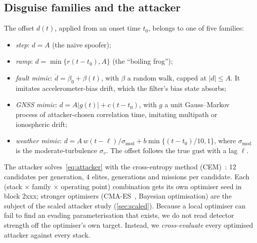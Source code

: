 \documentclass[letterpaper,twocolumn,10pt]{article}
\theoremstyle{remark}
\begin{document}
\subsection{Disguise families and the attacker}
The offset $d(t)$, applied from an onset time $t_0$, belongs to one of five
families:
\begin{itemize}
\item \emph{step}: $d=A$ (the naive spoofer);
\item \emph{ramp}: $d=\min\{r(t-t_0),A\}$ (the ``boiling frog'');
\item \emph{fault mimic}: $\ddot d=\beta_0+\beta(t)$, with $\beta$ a random walk,
  capped at $|d|\le A$. It imitates accelerometer-bias drift, which the filter's
  bias state absorbs;
\item \emph{GNSS mimic}: $d=A|g(t)|+c(t-t_0)$, with $g$ a unit Gauss--Markov
  process of attacker-chosen correlation time, imitating multipath or
  ionospheric drift;
\item \emph{weather mimic}: $d=A\,w(t-\ell)/\sigma_{\mathrm{mod}}+b\min\{(t-t_0)/10,1\}$,
  where $\sigma_{\mathrm{mod}}$ is the moderate-turbulence $\sigma_v$. The offset
  follows the true gust with a lag $\ell$.
\end{itemize}
The attacker solves~\eqref{eq:attacker} with the cross-entropy method
(CEM)~\cite{rubinstein2004cem}: 12 candidates per generation, 4 elites,
\nCemGens{} generations and \nCemK{} missions per candidate. Each
(stack $\times$ family $\times$ operating point) combination gets its own
optimiser seed in block 2xxx; stronger optimisers (CMA-ES~\cite{hansen2016cma},
Bayesian optimisation) are the subject of the scaled attacker study
(\cref{sec:scaled}). Because a local optimiser can fail
to find an evading parameterisation that exists, we do not read detector
strength off the optimiser's own target. Instead, we \emph{cross-evaluate} every
optimised attacker against every stack.
\end{document}

